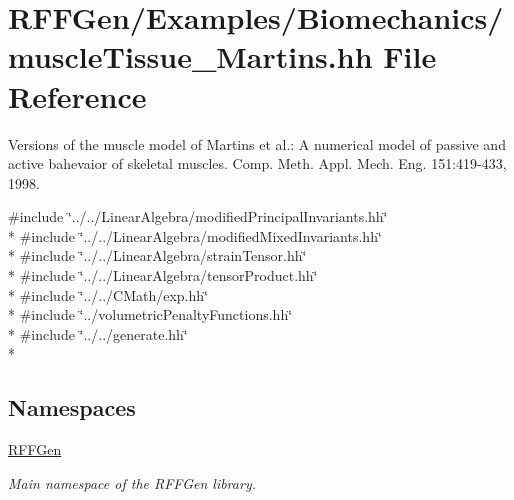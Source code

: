\hypertarget{muscleTissue__Martins_8hh}{\section{R\-F\-F\-Gen/\-Examples/\-Biomechanics/muscle\-Tissue\-\_\-\-Martins.hh File Reference}
\label{muscleTissue__Martins_8hh}
}


Versions of the muscle model of Martins et al.\-: A numerical model of passive and active bahevaior of skeletal muscles. Comp. Meth. Appl. Mech. Eng. 151\-:419-\/433, 1998.  


{\ttfamily \#include \char`\"{}../../\-Linear\-Algebra/modified\-Principal\-Invariants.\-hh\char`\"{}}\\*
{\ttfamily \#include \char`\"{}../../\-Linear\-Algebra/modified\-Mixed\-Invariants.\-hh\char`\"{}}\\*
{\ttfamily \#include \char`\"{}../../\-Linear\-Algebra/strain\-Tensor.\-hh\char`\"{}}\\*
{\ttfamily \#include \char`\"{}../../\-Linear\-Algebra/tensor\-Product.\-hh\char`\"{}}\\*
{\ttfamily \#include \char`\"{}../../\-C\-Math/exp.\-hh\char`\"{}}\\*
{\ttfamily \#include \char`\"{}../volumetric\-Penalty\-Functions.\-hh\char`\"{}}\\*
{\ttfamily \#include \char`\"{}../../generate.\-hh\char`\"{}}\\*
\subsection*{Namespaces}
\begin{DoxyCompactItemize}
\item 
\hyperlink{namespaceRFFGen}{R\-F\-F\-Gen}
\begin{DoxyCompactList}\small\item\em Main namespace of the R\-F\-F\-Gen library. \end{DoxyCompactList}\end{DoxyCompactItemize}

